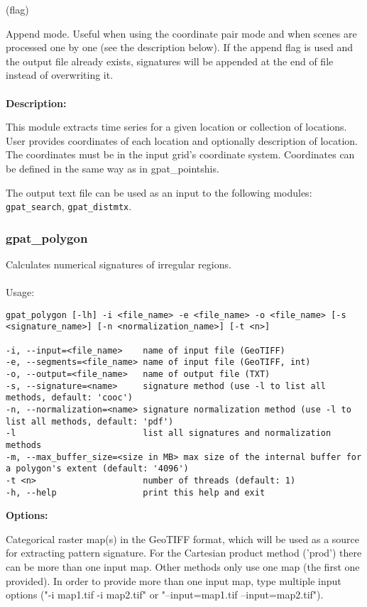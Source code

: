  (flag)

Append mode. 
Useful when using the coordinate pair mode and when scenes are processed one by one (see the description below). 
If the append flag is used and the output file already exists, signatures will be appended at the end of file instead of overwriting it.
\\\\
{\bf Description:}

This module extracts time series for a given location or collection of locations.
User provides coordinates of each location and optionally description of location. 
The coordinates must be in the input grid's coordinate system. 
Coordinates can be defined in the same way as in gpat\_pointshis. 

The output text file can be used as an input to the following modules: {\tt gpat\_search}, {\tt gpat\_distmtx}.

\subsubsection{gpat\_polygon}
Calculates numerical signatures of irregular regions.
\\\\
Usage:

\begin{minipage}{\linewidth}
\begin{lstlisting}
gpat_polygon [-lh] -i <file_name> -e <file_name> -o <file_name> [-s <signature_name>] [-n <normalization_name>] [-t <n>]

-i, --input=<file_name>    name of input file (GeoTIFF)
-e, --segments=<file_name> name of input file (GeoTIFF, int)
-o, --output=<file_name>   name of output file (TXT)
-s, --signature=<name>     signature method (use -l to list all methods, default: 'cooc')
-n, --normalization=<name> signature normalization method (use -l to list all methods, default: 'pdf')
-l                         list all signatures and normalization methods
-m, --max_buffer_size=<size in MB> max size of the internal buffer for a polygon's extent (default: '4096')
-t <n>                     number of threads (default: 1)
-h, --help                 print this help and exit
\end{lstlisting}
\end{minipage}

{\bf Options:}


Categorical raster map(s) in the GeoTIFF format, which will be used as a source for extracting pattern signature. 
For the Cartesian product method ('prod') there can be more than one input map. 
Other methods only use one map (the first one provided). 
In order to provide more than one input map, type multiple input options ("-i map1.tif -i map2.tif" or "--input=map1.tif --input=map2.tif").

